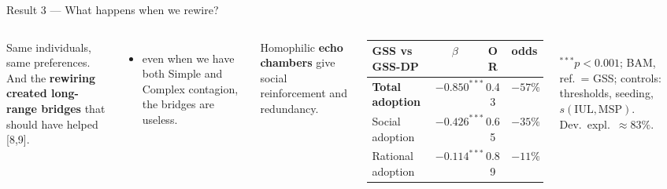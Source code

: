 \documentclass[aspectratio=169,11pt]{beamer}
\newcommand{\refn}[1]{{\color{ndgreen}[#1]}}
\newcommand{\emphr}[1]{{\color{ndreddark}\textbf{#1}}}
\begin{document}
\begin{frame}{Result 3 — What happens when we rewire?}
\begin{columns}[c]
\small
Same individuals, same preferences.\\
And the \emphr{rewiring created long-range bridges} that should have helped \refn{8,9}.
\begin{itemize}\small
  \item even when we have both Simple and Complex contagion, the bridges are useless.
\end{itemize}
\vspace{0.25cm}
Homophilic \emphr{echo chambers} give social reinforcement and redundancy.
\centering
\renewcommand{\arraystretch}{1.5}
{\footnotesize
\begin{tabular}{@{}lccc@{}}
\toprule
\textbf{GSS vs GSS-DP} & $\beta$ & OR & odds \\
\midrule
\rowcolor{ndred!10} \textbf{Total adoption} & $-0.850^{***}$ & 0.43 & \emphr{$-57\%$} \\
\rowcolor{ndblue!10} Social adoption & $-0.426^{***}$ & 0.65 & $-35\%$ \\
Rational adoption & $-0.114^{***}$ & 0.89 & $-11\%$ \\
\bottomrule
\end{tabular}}
\\[6pt]
{\scriptsize $^{***}p<0.001$; BAM, ref.\ = GSS; controls: thresholds, seeding,
$s(\mathrm{IUL},\mathrm{MSP})$. Dev.\ expl.\ $\approx83\%$.}
\end{columns}
\end{frame}
\end{document}
